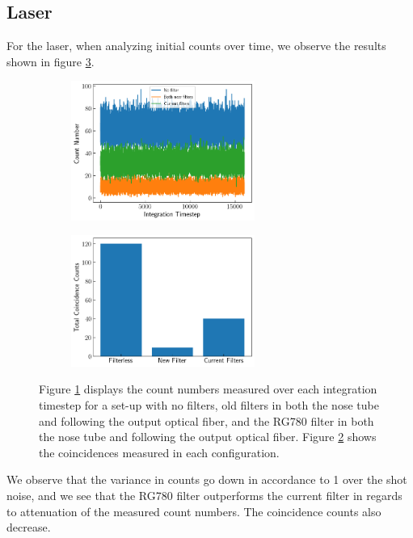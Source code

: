 \documentclass[letterpaper, 11 pt]{book}
\begin{document}
\subsection{Laser}
For the laser, when analyzing initial counts over time, we observe the results
shown in figure \ref{fig:filter_run}.
\begin{figure}[H]%
    \centering
    \begin{subfigure}{.4\textwidth}
    \includegraphics[width=6cm]{filter_ch1_laser.png}
    \caption{ }
    \label{fig:lch1}
    \end{subfigure}
    \begin{subfigure}{.4\textwidth}
    \includegraphics[width = 6cm]{filter_cc_laser.png}
    \caption{ }
    \label{fig:lcc}
    \end{subfigure}
    \caption{Figure \ref{fig:lch1} displays the count numbers measured over each
    integration timestep for a set-up with no filters, old filters in both the
    nose tube and following the output optical fiber, and the RG780 filter in
    both the nose tube and following the output optical fiber. Figure
    \ref{fig:lcc} shows the coincidences measured in each configuration.}
    \label{fig:filter_run}
\end{figure}
We observe that the variance in counts go down in accordance to 1 over the shot
noise, and we see that the RG780 filter outperforms the current filter in
regards to attenuation of the measured count numbers. The coincidence counts
also decrease.
\end{document}
